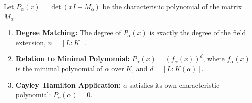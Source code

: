 \begin{theorem}
Let $P_\alpha(x) = \det(xI - M_\alpha)$ be the characteristic polynomial of the matrix $M_\alpha$.
\begin{enumerate}
    \item \textbf{Degree Matching:} The degree of $P_\alpha(x)$ is exactly the degree of the field extension, $n = [L:K]$.
    \item \textbf{Relation to Minimal Polynomial:} $P_\alpha(x) = (f_\alpha(x))^d$, where $f_\alpha(x)$ is the minimal polynomial of $\alpha$ over $K$, and $d = [L : K(\alpha)]$.
    \item \textbf{Cayley--Hamilton Application:} $\alpha$ satisfies its own characteristic polynomial: $P_\alpha(\alpha) = 0$.
\end{enumerate}
\end{theorem}

